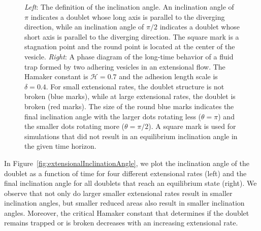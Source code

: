 \documentclass[prf,superscriptaddress,showpacs]{revtex4-1}
\begin{document}
\begin{figure}[htp]
\begin{minipage}{0.45\textwidth}
  \end{minipage}
  \caption{\label{fig:extensionalPhaseDiagram} {\em Left}: The
  definition of the inclination angle.  An inclination angle of $\pi$
  indicates a doublet whose long axis is parallel to the diverging
  direction, while an inclination angle of $\pi/2$ indicates a doublet
  whose short axis is parallel to the diverging direction.  The square
  mark is a stagnation point and the round point is located at the
  center of the vesicle. {\em Right}: A phase diagram of the long-time
  behavior of a fluid trap formed by two adhering vesicles in an
  extensional flow.  The Hamaker constant is $\mathcal{H}=0.7$ and the
  adhesion length scale is $\delta = 0.4$.  For small extensional rates,
  the doublet structure is not broken (blue marks), while at large
  extensional rates, the doublet is broken (red marks).  The size of the
  round blue marks indicates the final inclination angle with the larger
  dots rotating less ($\theta=\pi$) and the smaller dots rotating more
  ($\theta = \pi/2$).  A square mark is used for simulations that did
  not result in an equilibrium inclination angle in the given time
  horizon.}
\end{figure}

In Figure~\ref{fig:extensionalInclinationAngle}, we plot the inclination
angle of the doublet as a function of time for four different
extensional rates (left) and the final inclination angle for all
doublets that reach an equilibrium state (right).  We observe that not
only do larger smaller extensional rates result in smaller inclination
angles, but smaller reduced areas also result in smaller inclination
angles.  Moreover, the critical Hamaker constant that determines if the
doublet remains trapped or is broken decreases with an increasing
extensional rate.
\end{document}
